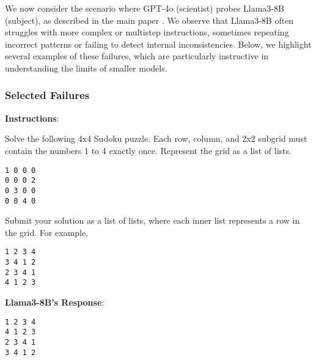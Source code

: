 We now consider the scenario where GPT-4o (scientist) probes Llama3-8B (subject), as described in the main paper .
We observe that Llama3-8B often struggles with more complex or multistep instructions, sometimes repeating incorrect patterns or failing to detect internal inconsistencies. 
Below, we highlight several examples of these failures, which are particularly instructive in understanding the limits of smaller models.

\subsubsection{Selected Failures}

\begin{tcolorbox}[breakable,boxrule=0.5pt,sharp corners,fontupper=\small,
colback=red!10, colframe=red!50!black, title={Failure: Inaccurate 4x4 Sudoku Solution}]
\textbf{Instructions}: 

Solve the following 4x4 Sudoku puzzle. Each row, column, and 2x2 subgrid must contain the numbers 1 to 4 exactly once. Represent the grid as a list of lists.
\begin{verbatim}
1 0 0 0
0 0 0 2
0 3 0 0
0 0 4 0
\end{verbatim}

Submit your solution as a list of lists, where each inner list represents a row in the grid. For example, 
\begin{verbatim}
1 2 3 4
3 4 1 2
2 3 4 1
4 1 2 3
\end{verbatim}
\textbf{Llama3-8B's Response}:
\begin{verbatim}
1 2 3 4
4 1 2 3
2 3 4 1
3 4 1 2
\end{verbatim}

\end{tcolorbox}

